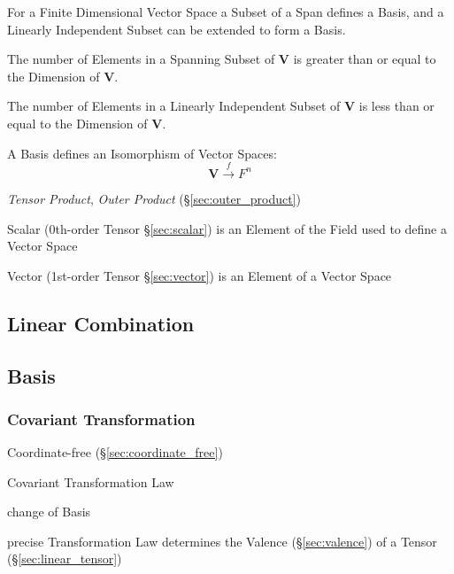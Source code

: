For a Finite Dimensional Vector Space a Subset of a Span defines a
Basis, and a Linearly Independent Subset can be extended to form a
Basis.

The number of Elements in a Spanning Subset of $\mathbf{V}$ is greater
than or equal to the Dimension of $\mathbf{V}$.

The number of Elements in a Linearly Independent Subset of
$\mathbf{V}$ is less than or equal to the Dimension of $\mathbf{V}$.

A Basis defines an Isomorphism of Vector Spaces:
\[
    \mathbf{V} \xrightarrow{f} F^n
\]

\emph{Tensor Product}, \emph{Outer Product} (\S\ref{sec:outer_product})

Scalar (0th-order Tensor \S\ref{sec:scalar}) is an Element of the
Field used to define a Vector Space

Vector (1st-order Tensor \S\ref{sec:vector}) is an Element of a Vector
Space



\subsection{Linear Combination}\label{sec:linear_combination}

\subsection{Basis}\label{sec:basis}

\subsubsection{Covariant Transformation}
\label{sec:covariant_transformation}

Coordinate-free (\S\ref{sec:coordinate_free})

Covariant Transformation Law

change of Basis

precise Transformation Law determines the Valence
(\S\ref{sec:valence}) of a Tensor (\S\ref{sec:linear_tensor})



